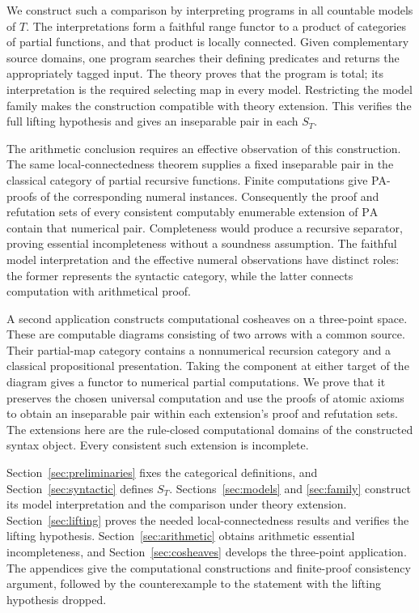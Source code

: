 \documentclass[11pt]{article}
\newcommand{\PA}{\mathrm{PA}}
\begin{document}
We construct such a comparison by interpreting programs in all
countable models of $T$. The interpretations form a faithful range
functor to a product of categories of partial functions, and that
product is locally connected. Given complementary source domains,
one program searches their defining predicates and returns the
appropriately tagged input. The theory proves that the program is
total; its interpretation is the required selecting map in every
model. Restricting the model family makes the construction compatible
with theory extension. This verifies the full lifting hypothesis
and gives an inseparable pair in each $S_T$.

The arithmetic conclusion requires an effective observation of this
construction. The same local-connectedness theorem supplies a fixed
inseparable pair in the classical category of partial recursive
functions. Finite computations give PA-proofs of the corresponding
numeral instances. Consequently the proof and refutation sets of
every consistent computably enumerable extension of $\PA$ contain
that numerical pair. Completeness would produce a recursive
separator, proving essential incompleteness without a soundness
assumption. The faithful model interpretation and the effective
numeral observations have distinct roles: the former represents the
syntactic category, while the latter connects computation with
arithmetical proof.

A second application constructs computational cosheaves on a
three-point space. These are computable diagrams consisting of two arrows with a
common source. Their partial-map category contains a nonnumerical
recursion category and a classical propositional presentation.
Taking the component at either target of the diagram gives a
functor to numerical partial computations. We prove that it preserves
the chosen universal computation and use the proofs of atomic
axioms to obtain an inseparable pair within each extension's
proof and refutation sets. The extensions here are the rule-closed
computational domains of the constructed syntax object. Every
consistent such extension is incomplete.

Section~\ref{sec:preliminaries} fixes the categorical definitions,
and Section~\ref{sec:syntactic} defines $S_T$.
Sections~\ref{sec:models} and \ref{sec:family} construct its
model interpretation and the comparison under theory extension.
Section~\ref{sec:lifting} proves the needed local-connectedness
results and verifies the lifting hypothesis.
Section~\ref{sec:arithmetic} obtains arithmetic essential
incompleteness, and Section~\ref{sec:cosheaves} develops the
three-point application. The appendices give the computational
constructions and finite-proof consistency argument, followed by
the counterexample to the statement with the lifting hypothesis dropped.
\end{document}
